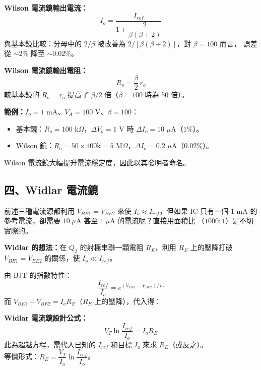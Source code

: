 \documentclass[12pt]{article}
\begin{document}
\begin{formulabox}
\textbf{Wilson 電流鏡輸出電流：}
\[
  I_o = \frac{I_{ref}}{1 + \dfrac{2}{\beta(\beta+2)}} \tag{12.33}
\]
與基本鏡比較：分母中的 $2/\beta$ 被改善為 $2/[\beta(\beta+2)]$，對 $\beta = 100$ 而言，
誤差從 $\sim 2\%$ 降至 $\sim 0.02\%$。

\medskip
\textbf{Wilson 電流鏡輸出電阻：}
\[
  R_o = \frac{\beta}{2}\,r_o \tag{12.37}
\]
較基本鏡的 $R_o = r_o$ 提高了 $\beta/2$ 倍（$\beta=100$ 時為 50 倍）。
\end{formulabox}

\noindent\textbf{範例：}$I_o = 1$ mA、$V_A = 100$ V、$\beta = 100$：
\begin{itemize}[leftmargin=2em,itemsep=1pt]
  \item 基本鏡：$R_o = 100$ k$\Omega$，$\Delta V_o = 1$ V 時 $\Delta I_o = 10$ $\mu$A（$1\%$）。
  \item Wilson 鏡：$R_o = 50 \times 100\text{k} = 5$ M$\Omega$，$\Delta I_o = 0.2$ $\mu$A（$0.02\%$）。
\end{itemize}
Wilson 電流鏡大幅提升電流穩定度，因此以其發明者命名。

\subsection*{四、Widlar 電流鏡}

\begin{keybox}
前述三種電流源都利用 $V_{BE1} = V_{BE2}$ 來使 $I_o \approx I_{ref}$，但如果 IC 只有一個
1 mA 的參考電流，卻需要 $10\;\mu$A 甚至 $1\;\mu$A 的電流呢？直接用面積比
（$1000:1$）是不切實際的。

\medskip
\textbf{Widlar 的想法：}在 $Q_2$ 的射極串聯一顆電阻 $R_E$，利用 $R_E$ 上的壓降打破
$V_{BE1} = V_{BE2}$ 的關係，使 $I_o \ll I_{ref}$。
\end{keybox}

\noindent 由 BJT 的指數特性：
\[
  \frac{I_{ref}}{I_o} = e^{(V_{BE1}-V_{BE2})/V_T}
\]
而 $V_{BE1} - V_{BE2} = I_o R_E$（$R_E$ 上的壓降），代入得：

\begin{formulabox}
\textbf{Widlar 電流鏡設計公式：}
\[
  V_T \ln\frac{I_{ref}}{I_o} = I_o R_E \tag{12.38}
\]
此為超越方程，需代入已知的 $I_{ref}$ 和目標 $I_o$ 來求 $R_E$（或反之）。\\
等價形式：$R_E = \dfrac{V_T}{I_o}\ln\dfrac{I_{ref}}{I_o}$。
\end{formulabox}
\end{document}
